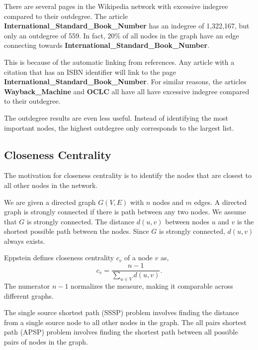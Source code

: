 \documentclass{article}
\begin{document}
There are several pages in the Wikipedia network with excessive indegree compared to their outdegree. 
The article \textbf{International\_Standard\_Book\_Number} has an indegree of 1,322,167, but only an outdegree of 559. In fact, 20\% of all nodes in the graph have an edge connecting towards \textbf{International\_Standard\_Book\_Number}.

This is because of the automatic linking from references.
Any article with a citation that has an ISBN identifier will link to the page \textbf{International\_Standard\_Book\_Number}.
For similar reasons, the articles \textbf{Wayback\_Machine} and \textbf{OCLC} all have all have excessive indegree compared to their outdegree.


The outdegree results are even less useful. Instead of identifying the most important nodes, the highest outdegree only corresponds to the largest list.

\subsection{Closeness Centrality}

The motivation for closeness centrality is to identify the nodes that are closest to all other nodes in the network.

We are given a directed graph $G(V,E)$ with $n$ nodes and $m$ edges.
A directed graph is strongly connected if there is path between any two nodes. We assume that $G$ is strongly connected.
The distance $d(u, v)$ between nodes $u$ and $v$ is the shortest possible path between the nodes.
Since $G$ is strongly connected, $d(u, v)$ always exists.


Eppstein\autocite{eppstein} defines closeness centrality $c_v$ of a node $v$ as,
\begin{equation*}
    c_v = \frac{n-1}{\sum_{u \in V}d(u,v)}.
\end{equation*} 
The numerator $n-1$ normalizes the measure, making it comparable across different graphs.


The single source shortest path (SSSP) problem involves finding the distance from a single source node to all other nodes in the graph.
The all pairs shortest path (APSP) problem involves finding the shortest path between all possible pairs of nodes in the graph.
\end{document}
